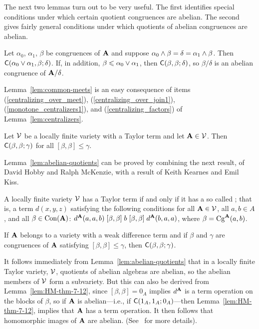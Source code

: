 The next two lemmas turn out to be very useful.
The first identifies special conditions
under which certain quotient congruences are abelian.
The second gives fairly general conditions under which
quotients of abelian congruences are abelian.
\begin{lem}
  \label{lem:common-meets}
  Let $\alpha_0$, $\alpha_1$, $\beta$ be congruences of $\mathbf{A}$ and suppose 
  $\alpha_0 \wedge \beta = \delta = \alpha_1 \wedge \beta$.
  Then $\mathsf{C}(\alpha_0 \vee \alpha_1,  \beta;  \delta)$.  If, in addition, 
  $\beta \leqslant \alpha_0 \vee \alpha_1$, then 
  $\mathsf{C}(\beta,  \beta;  \delta)$, so $\beta/\delta$ is an 
  abelian congruence of $\mathbf{A}/\delta$.
\end{lem}
Lemma~\ref{lem:common-meets}
is an easy consequence
of items (\ref{centralizing_over_meet}), (\ref{centralizing_over_join1}),
(\ref{monotone_centralizers1}), and (\ref{centralizing_factors}) of
  Lemma~\ref{lem:centralizers}.
\begin{lem}
  \label{lem:abelian-quotients}
  Let $\mathcal{V}$ be a locally finite variety with a Taylor term and let $\mathbf{A}\in \mathcal{V}$.
  Then $\mathsf{C}(\beta, \beta; \gamma)$ for all $[\beta, \beta] \leq \gamma$.
\end{lem}
Lemma~\ref{lem:abelian-quotients} can be proved  by combining  
the next result, of David Hobby and Ralph McKenzie,
with a result of Keith Kearnes and Emil Kiss.
\begin{lem}
  \label{lem:HM-thm-7-12}
  A locally finite variety $\mathcal{V}$ has a Taylor term if and only if it has a
  so called ; that is, a term $d(x,y,z)$ satisfying
  the following conditions for all $\mathbf{A} \in \mathcal{V}$, all $a, b \in A$, and all
  $\beta \in \operatorname{Con} (\mathbf{A})$: 
  $d^{\mathbf{A}}(a,a,b) \mathrel{[\beta, \beta]} b \mathrel{[\beta, \beta]} d^{\mathbf{A}}(b,a,a)$,
  where $\beta = \operatorname{Cg}^{\mathbf{A}}(a,b)$.
\end{lem}

\begin{lem}
  \label{lem:KK-lem-6-8}
  If $\mathbf{A}$ belongs to a variety with a
  weak difference term and if $\beta$ and $\gamma$ are congruences of $\mathbf{A}$
  satisfying $[\beta, \beta] \leq \gamma$, then $\mathsf{C}(\beta, \beta; \gamma)$.
\end{lem}
\begin{rem}
  \label{rem:abelian-quotients}
  It follows immediately from Lemma~\ref{lem:abelian-quotients} that in a locally
  finite Taylor variety, $\mathcal{V}$, quotients of abelian algebras are abelian, so the
  abelian members of $\mathcal{V}$ form a subvariety.
  But this can also be derived from Lemma~\ref{lem:HM-thm-7-12},
  since $[\beta, \beta] = 0_A$ implies $d^{\mathbf{A}}$ is a \malcev term operation on
  the blocks of $\beta$, so if $\mathbf{A}$ is abelian---i.e., if
  $\mathsf{C}(1_A, 1_A; 0_A)$---then Lemma~\ref{lem:HM-thm-7-12},
  implies that $\mathbf{A}$ has a \malcev term operation.
  It then follows that homomorphic images of $\mathbf{A}$ are
  abelian. (See~\cite[Cor~7.28]{MR2839398} for more details). 
\end{rem}



